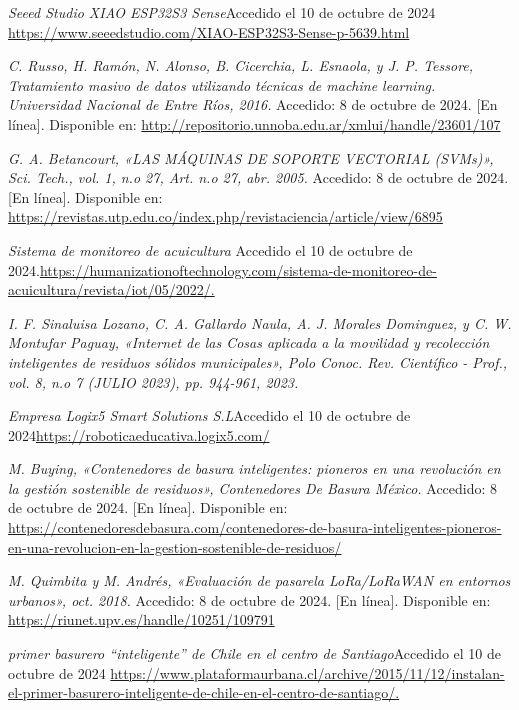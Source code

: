 \begin{thebibliography}{99}
    \textit{Seeed Studio XIAO ESP32S3 Sense}Accedido el 10 de octubre de 2024 \url{https://www.seeedstudio.com/XIAO-ESP32S3-Sense-p-5639.html}
    
    \textit{C. Russo, H. Ramón, N. Alonso, B. Cicerchia, L. Esnaola, y J. P. Tessore, Tratamiento masivo de datos utilizando técnicas de machine learning. Universidad Nacional de Entre Ríos, 2016.} Accedido: 8 de octubre de 2024. [En línea]. Disponible en: \url{http://repositorio.unnoba.edu.ar/xmlui/handle/23601/107}
    
    \textit{G. A. Betancourt, «LAS MÁQUINAS DE SOPORTE VECTORIAL (SVMs)», Sci. Tech., vol. 1, n.o 27, Art. n.o 27, abr. 2005.} Accedido: 8 de octubre de 2024. [En línea]. Disponible en: \url{https://revistas.utp.edu.co/index.php/revistaciencia/article/view/6895}

    \textit{Sistema de monitoreo de acuicultura} Accedido el 10 de octubre de 2024.\url{https://humanizationoftechnology.com/sistema-de-monitoreo-de-acuicultura/revista/iot/05/2022/.}
    
    \textit{I. F. Sinaluisa Lozano, C. A. Gallardo Naula, A. J. Morales Dominguez, y C. W. Montufar Paguay, «Internet de las Cosas aplicada a la movilidad y recolección inteligentes de residuos sólidos municipales», Polo Conoc. Rev. Científico - Prof., vol. 8, n.o 7 (JULIO 2023), pp. 944-961, 2023.}

    \textit{Empresa Logix5 Smart Solutions S.L}Accedido el 10 de octubre de 2024\url{https://roboticaeducativa.logix5.com/}
    
    \textit{M. Buying, «Contenedores de basura inteligentes: pioneros en una revolución en la gestión sostenible de residuos», Contenedores De Basura México.} Accedido: 8 de octubre de 2024. [En línea]. Disponible en: \url{https://contenedoresdebasura.com/contenedores-de-basura-inteligentes-pioneros-en-una-revolucion-en-la-gestion-sostenible-de-residuos/}
    
    \textit{M. Quimbita y M. Andrés, «Evaluación de pasarela LoRa/LoRaWAN en entornos urbanos», oct. 2018.} Accedido: 8 de octubre de 2024. [En línea]. Disponible en: \url{https://riunet.upv.es/handle/10251/109791}

    \textit{primer basurero “inteligente” de Chile en el centro de Santiago}Accedido el 10 de octubre de 2024 \url{https://www.plataformaurbana.cl/archive/2015/11/12/instalan-el-primer-basurero-inteligente-de-chile-en-el-centro-de-santiago/.}
    

\end{thebibliography}
